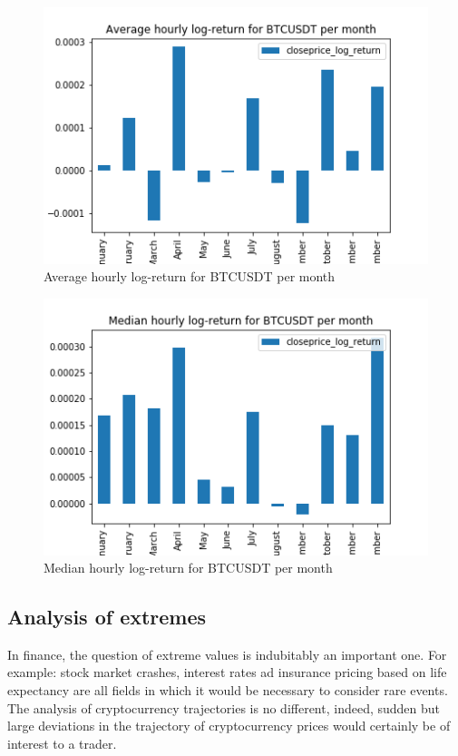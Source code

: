 \documentclass[twoside]{report}
\begin{document}
\begin{spacing}{1}
\begin{figure}[!htbp]
    \centering
    \includegraphics[scale = 0.5]{Images/Average hourly log-return for BTCUSDT per month.png}
    \caption{Average hourly log-return for BTCUSDT per month}
    \label{Average hourly log-return for BTCUSDT per month}
\end{figure}

\begin{figure}[!htbp]
    \centering
    \includegraphics[scale = 0.5]{Images/Median hourly log-return for BTCUSDT per month.png}
    \caption{Median hourly log-return for BTCUSDT per month}
    \label{Median hourly log-return for BTCUSDT per month}
\end{figure}


\subsection{Analysis of extremes}

In finance, the question of extreme values is indubitably an important one. For example: stock market crashes, interest rates ad  insurance pricing based on life expectancy are all fields in which it would be necessary to consider rare events. The analysis of cryptocurrency trajectories is no different, indeed, sudden but large deviations in the trajectory of cryptocurrency prices would certainly be of interest to a trader. 


\end{spacing}
\end{document}
